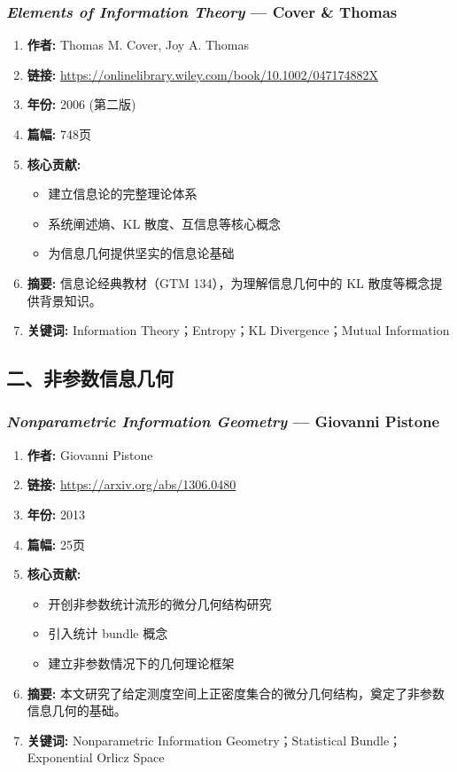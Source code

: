 \subsubsection{\textbf{\textit{Elements of Information Theory}} — Cover \& Thomas}
\begin{enumerate}
    \item \textbf{作者:} Thomas M. Cover, Joy A. Thomas
    \item \textbf{链接:} \url{https://onlinelibrary.wiley.com/book/10.1002/047174882X}
    \item \textbf{年份:} 2006 (第二版)
    \item \textbf{篇幅:} 748页
    \item \textbf{核心贡献:}
        \begin{itemize}
            \item 建立信息论的完整理论体系
            \item 系统阐述熵、KL 散度、互信息等核心概念
            \item 为信息几何提供坚实的信息论基础
        \end{itemize}
    \item \textbf{摘要:} 信息论经典教材（GTM 134），为理解信息几何中的 KL 散度等概念提供背景知识。
    \item \textbf{关键词:} Information Theory；Entropy；KL Divergence；Mutual Information
\end{enumerate}

\subsection{二、非参数信息几何}

\subsubsection{\textbf{\textit{Nonparametric Information Geometry}} — Giovanni Pistone}
\begin{enumerate}
    \item \textbf{作者:} Giovanni Pistone
    \item \textbf{链接:} \url{https://arxiv.org/abs/1306.0480}
    \item \textbf{年份:} 2013
    \item \textbf{篇幅:} 25页
    \item \textbf{核心贡献:}
        \begin{itemize}
            \item 开创非参数统计流形的微分几何结构研究
            \item 引入统计 bundle 概念
            \item 建立非参数情况下的几何理论框架
        \end{itemize}
    \item \textbf{摘要:} 本文研究了给定测度空间上正密度集合的微分几何结构，奠定了非参数信息几何的基础。
    \item \textbf{关键词:} Nonparametric Information Geometry；Statistical Bundle；Exponential Orlicz Space
\end{enumerate}

